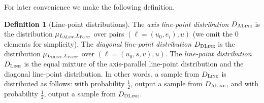 \documentclass[11pt]{article}
\theoremstyle{definition}
\newtheorem{definition}[theorem]{Definition}
\newcommand{\typestyle}[1]{\ensuremath{\textsc{#1}}\xspace}
\newcommand{\Point}{\typestyle{Point}}
\newcommand{\Line}{\typestyle{Line}}
\newcommand{\ALine}{\typestyle{ALine}}
\newcommand{\DLine}{\typestyle{DLine}}
\begin{document}
For later convenience we make the following definition. 

\begin{definition}[Line-point distributions]
        \label{def:line-point-dist}
 The \emph{axis line-point distribution} $D_{\ALine}$ is the
 distribution $\mu_{L_\ALine,L_\Point}$ over pairs $(\ell=(u_0,e_i),u)$
 (we omit the $0$ elements for simplicity). The \emph{diagonal
   line-point distribution} $D_{\DLine}$ is the distribution
 $\mu_{L_\DLine,L_\Point}$  over $(\ell=(u_0,s,v),u)$. The
 \emph{line-point distribution} $D_{\Line}$ is the equal mixture of the axis-parallel line-point distribution and the diagonal line-point distribution.
 In other words, a sample from $D_{\Line}$ is distributed as follows:
 with probability $\tfrac{1}{2}$, output a sample from $D_{\ALine}$,
 and with probability $\tfrac{1}{2}$, output a sample from $D_{\DLine}$.
\end{definition}
\end{document}
